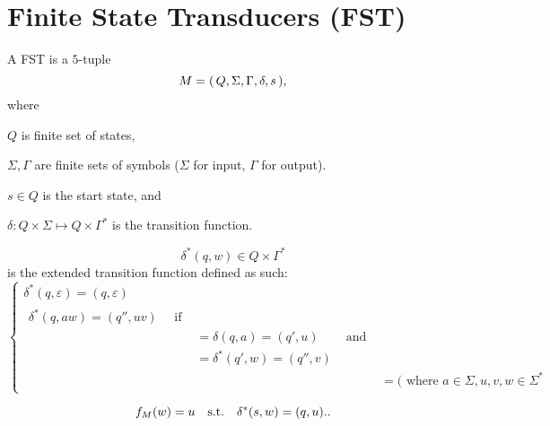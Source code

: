 \section{Finite State Transducers (FST)}

\begin{definition}
    A FST is a $5$-tuple
    \[
        M = { \left(\, Q,\Sigma,\Gamma,\delta,s \,\right) }
    ,\]
    where
    \begin{compactitem}
    \item $Q$ is finite set of states,
    \item $\Sigma, \Gamma$ are finite sets of symbols 
            ($\Sigma$ for input, $\Gamma$ for output).
    \item $s \in Q$ is the start state, and
    \item $\delta \colon Q \times \Sigma \mapsto Q \times \Gamma^*$
        is the transition function.
    \end{compactitem}
\end{definition}

\begin{definition}
    \[ 
    \delta^*(q,w) \in Q \times \Gamma^*
    \]
    is the extended transition function defined as such:
    \[
        \begin{cases}
            \delta^*(q,\varepsilon) = (q,\varepsilon) \\
            \begin{matrix}
                \delta^*(q,aw)  =  (q'',uv) \quad \text{ if } \\
                              & =  \delta(q,a)    = (q',u) & \text{ and } \\
                              & =  \delta^*(q',w) = (q'',v) \\
                              & & &=  (\text{ where $a \in \Sigma, u,v,w \in \Sigma^*$}
            \end{matrix}
        \end{cases}
    \]
\end{definition}

\begin{definition}
\[
    f_M(w) = u \quad\text{\upshape s.t.}\quad \delta^*(s,w) = (q,u).
.\]
\end{definition}
